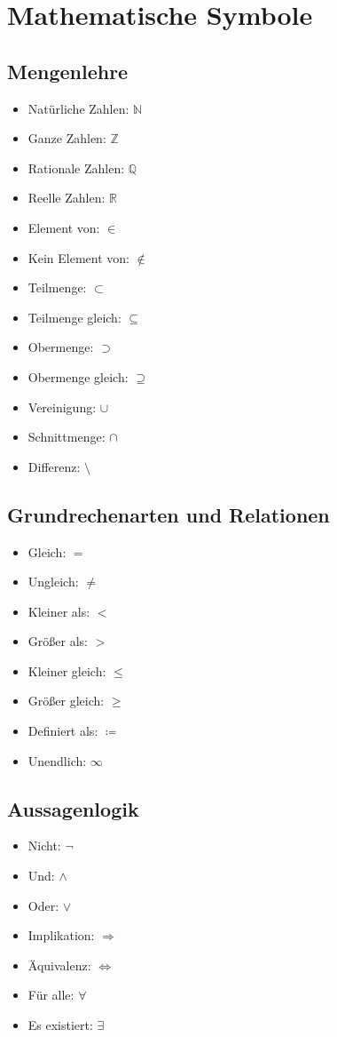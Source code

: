 





\section{Mathematische Symbole}
\subsection{Mengenlehre}
\begin{itemize}
    \item Natürliche Zahlen: $\mathbb{N}$
    \item Ganze Zahlen: $\mathbb{Z}$
    \item Rationale Zahlen: $\mathbb{Q}$
    \item Reelle Zahlen: $\mathbb{R}$
    \item Element von: $\in$
    \item Kein Element von: $\notin$
    \item Teilmenge: $\subset$
    \item Teilmenge gleich: $\subseteq$
    \item Obermenge: $\supset$
    \item Obermenge gleich: $\supseteq$
    \item Vereinigung: $\cup$
    \item Schnittmenge: $\cap$
    \item Differenz: $\setminus$
\end{itemize}
\subsection{Grundrechenarten und Relationen}
\begin{itemize}
    \item Gleich: $=$
    \item Ungleich: $\neq$
    \item Kleiner als: $<$
    \item Größer als: $>$
    \item Kleiner gleich: $\leq$
    \item Größer gleich: $\geq$
    \item Definiert als: $\coloneqq$
    \item Unendlich: $\infty$
\end{itemize}
\subsection{Aussagenlogik}
\begin{itemize}
    \item Nicht: $\neg$
    \item Und: $\wedge$
    \item Oder: $\vee$
    \item Implikation: $\Rightarrow$
    \item Äquivalenz: $\Leftrightarrow$
    \item Für alle: $\forall$
    \item Es existiert: $\exists$
\end{itemize}
